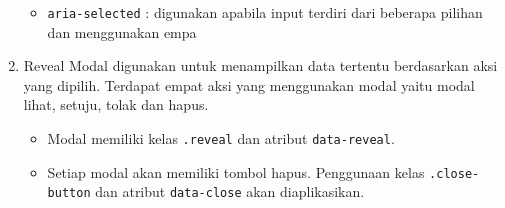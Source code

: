 \begin{enumerate}
\begin{itemize}
		\item \colorbox{mygray}{\texttt{aria-selected}} : digunakan apabila input terdiri dari beberapa pilihan dan menggunakan empa
	\end{itemize}	
	\item Reveal
	Modal digunakan untuk menampilkan data tertentu berdasarkan aksi yang dipilih. Terdapat empat aksi yang menggunakan modal yaitu modal lihat, setuju, tolak dan hapus.
	\begin{itemize}
		\item Modal memiliki kelas \colorbox{mygray}{\texttt{.reveal}} dan atribut \colorbox{mygray}{\texttt{data-reveal}}.
		\item Setiap modal akan memiliki tombol hapus. Penggunaan kelas \texttt{.close-button} dan atribut \colorbox{mygray}{\texttt{data-close}} akan diaplikasikan.
	\end{itemize} 	 
\end{enumerate}

